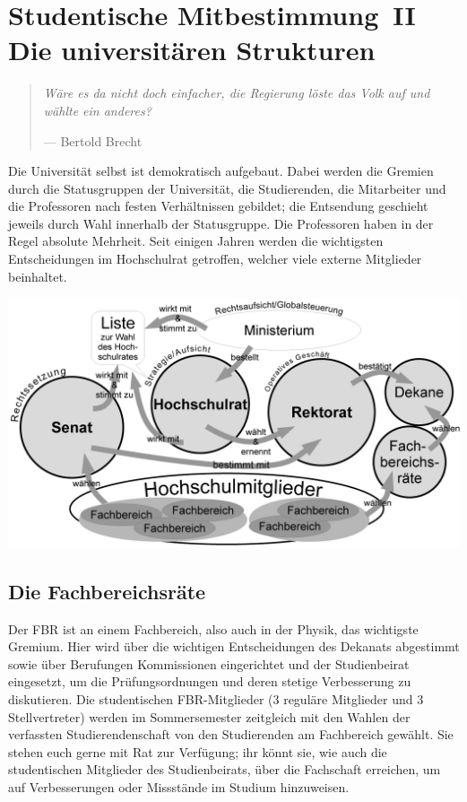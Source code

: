 \clearpage

\section*{Studentische Mitbestimmung~II\\Die universitären Strukturen}
\begin{multicols*}{2}
\begin{quote}
	\textit{Wäre es da nicht doch einfacher, die Regierung löste das Volk auf und wählte ein anderes?}
	
	\hfill--- Bertold Brecht
\end{quote}
Die Universität selbst ist demokratisch aufgebaut. Dabei werden die Gremien durch die Statusgruppen der Universität, die Studierenden, die Mitarbeiter und die Professoren nach festen Verhältnissen gebildet; die Entsendung geschieht jeweils durch Wahl innerhalb der Statusgruppe.
Die Professoren haben in der Regel absolute Mehrheit. Seit einigen Jahren werden die wichtigsten Entscheidungen im Hochschulrat getroffen, welcher viele externe Mitglieder beinhaltet.

\includegraphics[width=\columnwidth]{res/uni_strukturen.png}

\subsection{Die Fachbereichsräte}
Der FBR ist an einem Fachbereich, also auch in der Physik, das wichtigste Gremium.
Hier wird über die wichtigen Entscheidungen des Dekanats abgestimmt sowie über Berufungen Kommissionen eingerichtet und der Studienbeirat eingesetzt, um die Prüfungsordnungen und deren stetige Verbesserung zu diskutieren.
Die studentischen FBR-Mitglieder (3 reguläre Mitglieder und 3 Stellvertreter) werden im Sommersemester zeitgleich mit den Wahlen der verfassten Studierendenschaft von den Studierenden am Fachbereich gewählt.
Sie stehen euch gerne mit Rat zur Verfügung; ihr könnt sie, wie auch die studentischen Mitglieder des Studienbeirats, über die Fachschaft erreichen, um auf Verbesserungen oder Missstände im Studium hinzuweisen.


\end{multicols*}
